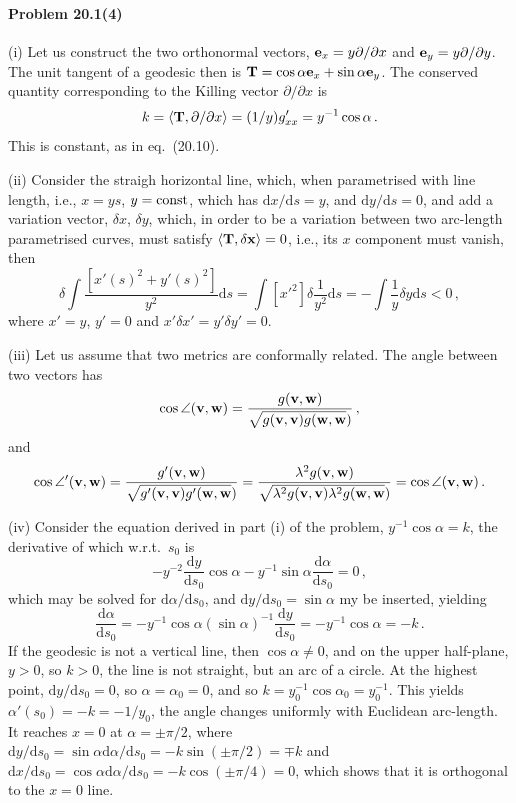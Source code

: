\documentclass[a4paper,12pt]{article}
\def\d{\mathrm{d}}
\newcommand{\problem}[1]{\paragraph{Problem #1}}
\begin{document}

\problem{20.1(4)} (i) Let us construct the two orthonormal vectors, ${\bf e}_x = y \partial/\partial x$ and ${\bf e}_y = y \partial/\partial y$. The unit tangent of a geodesic then is ${\bf T} = \cos\alpha {\bf e}_x + \sin\alpha {\bf e}_y$. The conserved quantity corresponding to the Killing vector $\partial/\partial x$ is
\[
 k = \langle {\bf T}, \partial/\partial x\rangle = (1/y) g_{xx}' = y^{-1}\cos\alpha\,.
\]
This is constant, as in eq.\ (20.10).

(ii) Consider the straigh horizontal line, which, when parametrised with line length, i.e., $x=y s$, $y={\rm const}$, which has $\d x/\d s = y$, and $\d y/\d s =0$, and add a variation vector, $\delta x$, $\delta y$, which, in order to be a variation between two arc-length parametrised curves, must satisfy $\langle {\bf T}, \delta{\bf x}\rangle = 0$, i.e., its $x$ component must vanish, then
\[
 \delta \int \frac{\left[ x'(s)^2 + y'(s)^2 \right]}{ y^2} \d s= \int [ x'^2 ]\delta \frac{1}{y^2}\d s  = -\int \frac{1}{y}\delta y \d s < 0\,,
\]
where $x'=y$, $y'=0$ and $x'\delta x' = y'\delta y' = 0$.

(iii) Let us assume that two metrics are conformally related. The angle between two vectors has
\[
 \cos \angle ({\bf v}, {\bf w}) = \frac{g({\bf v}, {\bf w})}{\sqrt{g({\bf v}, {\bf v})g({\bf w}, {\bf w}})}\,,
\]
and
\[
 \cos \angle' ({\bf v}, {\bf w}) = \frac{g'({\bf v}, {\bf w})}{\sqrt{g'({\bf v}, {\bf v})g'({\bf w}, {\bf w}})} = \frac{\lambda^2 g({\bf v}, {\bf w})}{\sqrt{\lambda^2 g({\bf v}, {\bf v}) \lambda^2g({\bf w}, {\bf w}})} = \cos \angle ({\bf v}, {\bf w})\,.
\]

(iv) Consider the equation derived in part (i) of the problem, $y^{-1} \cos\alpha = k$, the derivative of which w.r.t.\ $s_0$ is
\[
 - y^{-2}\frac{\d y}{\d s_0}\cos\alpha - y^{-1}\sin\alpha\frac{\d\alpha}{\d s_0} = 0\,,
\]
which may be solved for $\d\alpha/\d s_0$, and $\d y/\d s_0 = \sin\alpha$ my be inserted, yielding
\[
 \frac{\d\alpha}{\d s_0} = - y^{-1}\cos\alpha (\sin\alpha)^{-1}\frac{\d y}{\d s_0} = -y^{-1}\cos\alpha = -k\,.
\]
If the geodesic is not a vertical line, then $\cos\alpha\ne 0$, and on the upper half-plane, $y>0$, so $k>0$, the line is not straight, but an arc of a circle. At the highest point, $\d y/\d s_0 = 0$, so $\alpha=\alpha_0=0$, and so $k = y_0^{-1}\cos\alpha_0 = y_0^{-1}$. This yields $\alpha'(s_0) = -k = -1/y_0$, the angle changes uniformly with Euclidean arc-length. It reaches $x=0$ at $\alpha = \pm \pi/2$, where $\d y/\d s_0 = \sin\alpha \d \alpha/\d s_0  = -k \sin (\pm \pi/2) = \mp k$ and $\d x/\d s_0 = \cos\alpha \d\alpha/\d s_0 = -k \cos (\pm \pi/4) = 0$, which shows that it is orthogonal to the $x=0$ line.
\end{document}
